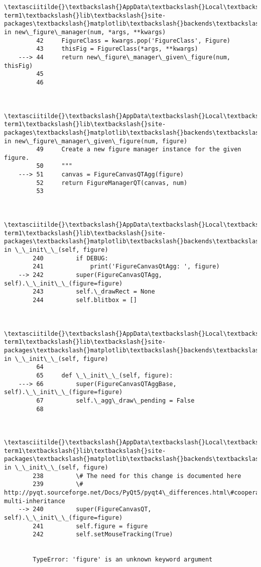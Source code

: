 \documentclass[11pt]{article}
\begin{document}
\begin{Verbatim}[commandchars=\\\{\}]
        \textasciitilde{}\textbackslash{}AppData\textbackslash{}Local\textbackslash{}Continuum\textbackslash{}miniconda3\textbackslash{}envs\textbackslash{}carnd-term1\textbackslash{}lib\textbackslash{}site-packages\textbackslash{}matplotlib\textbackslash{}backends\textbackslash{}backend\_qt5agg.py in new\_figure\_manager(num, *args, **kwargs)
         42     FigureClass = kwargs.pop('FigureClass', Figure)
         43     thisFig = FigureClass(*args, **kwargs)
    ---> 44     return new\_figure\_manager\_given\_figure(num, thisFig)
         45 
         46 
    

        \textasciitilde{}\textbackslash{}AppData\textbackslash{}Local\textbackslash{}Continuum\textbackslash{}miniconda3\textbackslash{}envs\textbackslash{}carnd-term1\textbackslash{}lib\textbackslash{}site-packages\textbackslash{}matplotlib\textbackslash{}backends\textbackslash{}backend\_qt5agg.py in new\_figure\_manager\_given\_figure(num, figure)
         49     Create a new figure manager instance for the given figure.
         50     """
    ---> 51     canvas = FigureCanvasQTAgg(figure)
         52     return FigureManagerQT(canvas, num)
         53 
    

        \textasciitilde{}\textbackslash{}AppData\textbackslash{}Local\textbackslash{}Continuum\textbackslash{}miniconda3\textbackslash{}envs\textbackslash{}carnd-term1\textbackslash{}lib\textbackslash{}site-packages\textbackslash{}matplotlib\textbackslash{}backends\textbackslash{}backend\_qt5agg.py in \_\_init\_\_(self, figure)
        240         if DEBUG:
        241             print('FigureCanvasQtAgg: ', figure)
    --> 242         super(FigureCanvasQTAgg, self).\_\_init\_\_(figure=figure)
        243         self.\_drawRect = None
        244         self.blitbox = []
    

        \textasciitilde{}\textbackslash{}AppData\textbackslash{}Local\textbackslash{}Continuum\textbackslash{}miniconda3\textbackslash{}envs\textbackslash{}carnd-term1\textbackslash{}lib\textbackslash{}site-packages\textbackslash{}matplotlib\textbackslash{}backends\textbackslash{}backend\_qt5agg.py in \_\_init\_\_(self, figure)
         64 
         65     def \_\_init\_\_(self, figure):
    ---> 66         super(FigureCanvasQTAggBase, self).\_\_init\_\_(figure=figure)
         67         self.\_agg\_draw\_pending = False
         68 
    

        \textasciitilde{}\textbackslash{}AppData\textbackslash{}Local\textbackslash{}Continuum\textbackslash{}miniconda3\textbackslash{}envs\textbackslash{}carnd-term1\textbackslash{}lib\textbackslash{}site-packages\textbackslash{}matplotlib\textbackslash{}backends\textbackslash{}backend\_qt5.py in \_\_init\_\_(self, figure)
        238         \# The need for this change is documented here
        239         \# http://pyqt.sourceforge.net/Docs/PyQt5/pyqt4\_differences.html\#cooperative-multi-inheritance
    --> 240         super(FigureCanvasQT, self).\_\_init\_\_(figure=figure)
        241         self.figure = figure
        242         self.setMouseTracking(True)
    

        TypeError: 'figure' is an unknown keyword argument

    \end{Verbatim}
\end{document}
